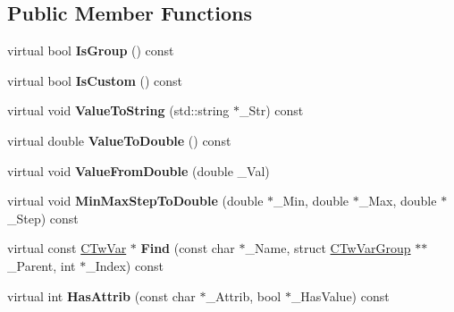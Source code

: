 \subsection*{Public Member Functions}
\begin{DoxyCompactItemize}
\item 
\hypertarget{struct_c_tw_var_atom_ad11bc0a1d3ae018c4d284917a2ed1809}{virtual bool {\bfseries Is\+Group} () const }\label{struct_c_tw_var_atom_ad11bc0a1d3ae018c4d284917a2ed1809}

\item 
\hypertarget{struct_c_tw_var_atom_a0b309cdef0208467fc49bbceb3562835}{virtual bool {\bfseries Is\+Custom} () const }\label{struct_c_tw_var_atom_a0b309cdef0208467fc49bbceb3562835}

\item 
\hypertarget{struct_c_tw_var_atom_a02c01d795d003c130c4ea799e4315d54}{virtual void {\bfseries Value\+To\+String} (std\+::string $\ast$\+\_\+\+Str) const }\label{struct_c_tw_var_atom_a02c01d795d003c130c4ea799e4315d54}

\item 
\hypertarget{struct_c_tw_var_atom_a1f2c825f5cd2d04bb1f43d873d825cc8}{virtual double {\bfseries Value\+To\+Double} () const }\label{struct_c_tw_var_atom_a1f2c825f5cd2d04bb1f43d873d825cc8}

\item 
\hypertarget{struct_c_tw_var_atom_a488dc7409f46de3fe99009b8d3ec5b26}{virtual void {\bfseries Value\+From\+Double} (double \+\_\+\+Val)}\label{struct_c_tw_var_atom_a488dc7409f46de3fe99009b8d3ec5b26}

\item 
\hypertarget{struct_c_tw_var_atom_a41f050dec4d3110bdf6f7be8d34da75f}{virtual void {\bfseries Min\+Max\+Step\+To\+Double} (double $\ast$\+\_\+\+Min, double $\ast$\+\_\+\+Max, double $\ast$\+\_\+\+Step) const }\label{struct_c_tw_var_atom_a41f050dec4d3110bdf6f7be8d34da75f}

\item 
\hypertarget{struct_c_tw_var_atom_a091ec56a838de4b9b21564c5f78f82fe}{virtual const \hyperlink{struct_c_tw_var}{C\+Tw\+Var} $\ast$ {\bfseries Find} (const char $\ast$\+\_\+\+Name, struct \hyperlink{struct_c_tw_var_group}{C\+Tw\+Var\+Group} $\ast$$\ast$\+\_\+\+Parent, int $\ast$\+\_\+\+Index) const }\label{struct_c_tw_var_atom_a091ec56a838de4b9b21564c5f78f82fe}

\item 
\hypertarget{struct_c_tw_var_atom_a16ea6d0c47aec9198905b718cb7c0ef9}{virtual int {\bfseries Has\+Attrib} (const char $\ast$\+\_\+\+Attrib, bool $\ast$\+\_\+\+Has\+Value) const }\label{struct_c_tw_var_atom_a16ea6d0c47aec9198905b718cb7c0ef9}


\end{DoxyCompactItemize}
